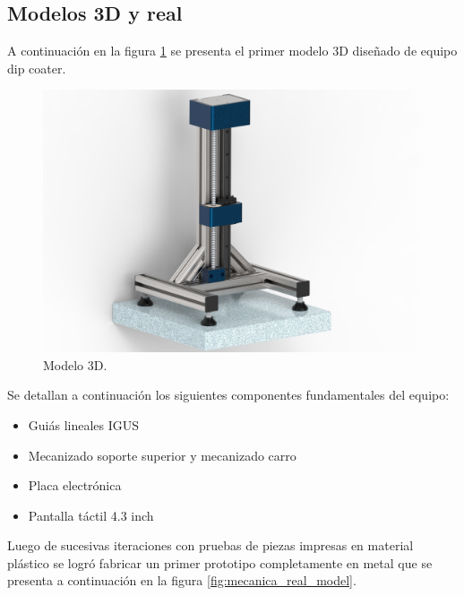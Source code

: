 \subsection{Modelos 3D y real}

A continuación en la figura \ref{fig:mecanica_3d_model} se presenta el primer modelo 3D diseñado de equipo dip coater.
\begin{figure}[h]
	\centering
	\includegraphics[width=1\textwidth]{./Figures/3d.jpg}
	\caption{Modelo 3D.}
	\label{fig:mecanica_3d_model}
\end{figure}

Se detallan a continuación los siguientes componentes fundamentales del equipo:

\begin{itemize}
\item Guiás lineales IGUS 
\item Mecanizado soporte superior y mecanizado carro
\item Placa electrónica
\item Pantalla táctil 4.3 inch
\end{itemize}

Luego de sucesivas iteraciones con pruebas de piezas impresas en material plástico se logró fabricar un primer prototipo completamente en metal que se presenta a continuación en la figura \ref{fig:mecanica_real_model}.

